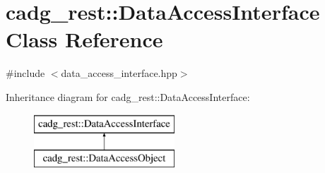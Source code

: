 \hypertarget{classcadg__rest_1_1_data_access_interface}{}\section{cadg\+\_\+rest\+::Data\+Access\+Interface Class Reference}
\label{classcadg__rest_1_1_data_access_interface}


{\ttfamily \#include $<$data\+\_\+access\+\_\+interface.\+hpp$>$}

Inheritance diagram for cadg\+\_\+rest\+::Data\+Access\+Interface\+:\begin{figure}[H]
\begin{center}
\leavevmode
\includegraphics[height=2.000000cm]{classcadg__rest_1_1_data_access_interface}
\end{center}
\end{figure}

